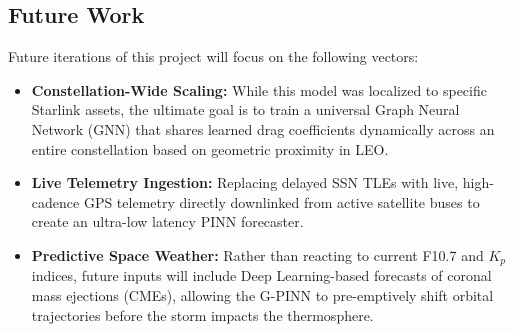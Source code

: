\subsection{Future Work}
Future iterations of this project will focus on the following vectors:
\begin{itemize}
    \item \textbf{Constellation-Wide Scaling:} While this model was localized to specific Starlink assets, the ultimate goal is to train a universal Graph Neural Network (GNN) that shares learned drag coefficients dynamically across an entire constellation based on geometric proximity in LEO.
    \item \textbf{Live Telemetry Ingestion:} Replacing delayed SSN TLEs with live, high-cadence GPS telemetry directly downlinked from active satellite buses to create an ultra-low latency PINN forecaster.
    \item \textbf{Predictive Space Weather:} Rather than reacting to current F10.7 and $K_p$ indices, future inputs will include Deep Learning-based forecasts of coronal mass ejections (CMEs), allowing the G-PINN to pre-emptively shift orbital trajectories before the storm impacts the thermosphere.
\end{itemize}

